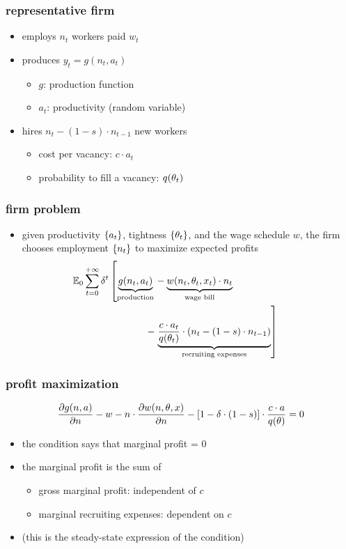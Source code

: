 \documentclass[12pt,xcolor={dvipsnames},hyperref={pdftex,pdfpagemode=UseNone,hidelinks,pdfdisplaydoctitle=true},usepdftitle=false]{beamer}
\begin{document}
\begin{frame}
\frametitle{representative firm}
\begin{itemize}
\item employs $n_{t}$ workers paid $w_{t}$
\item produces $y_{t}= g(n_{t},a_{t})$
\begin{itemize}
\item $g$: production function
\item $a_{t}$: productivity (random variable)
\end{itemize}
\item hires $n_{t}-(1-s)\cdot n_{t-1}$ new workers
\begin{itemize}
\item cost per vacancy: $c\cdot  a_{t}$
\item probability to fill a vacancy: $q(\theta_{t})$
\end{itemize}
\end{itemize}
\end{frame}

\begin{frame}
\frametitle{firm problem}
\begin{itemize}
\item given productivity $\left\lbrace a_t \right\rbrace$, tightness $\left\lbrace \theta_t \right\rbrace$, and the wage schedule $w$, the firm chooses employment $\left\lbrace n_{t} \right\rbrace$ to maximize expected profits
\begin{align*}\hspace*{-1cm}
\E_0 \sum_{t=0}^{+\infty} \d^t\left[\underbrace{g(n_{t},a_{t})}_{\text{production}}\right.&-\underbrace{w(n_t,\t_t,x_t)\cdot  n_t}_{\text{wage bill}}\\
-&\left.\underbrace{\frac{c \cdot a_{t}}{q(\t_{t})}\cdot \bp{n_{t}-(1-s)\cdot  n_{t-1}}}_{\text{recruiting expenses}}\right]
\end{align*}
\end{itemize}
\end{frame}


\begin{frame}
\frametitle{profit maximization}
\begin{equation*}
\frac{\partial g(n,a)}{\partial n}- w- n \cdot \frac{\partial w(n,\theta,x)}{\partial n}-\left[ 1-\delta \cdot (1-s) \right]\cdot \frac{c \cdot a}{q(\theta)}=0
\end{equation*}
\begin{itemize}
\item the condition says that marginal profit = 0
\item the marginal profit is the sum of 
\begin{itemize}
\item gross marginal profit: independent of $c$
\item marginal recruiting expenses: dependent on $c$
\end{itemize}
\item (this is the steady-state expression of the condition)
\end{itemize}
\end{frame}
\end{document}
